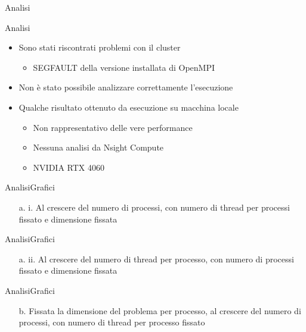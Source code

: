 \begin{frame}
    \centering \Huge
    Analisi
\end{frame}

\begin{frame}{Analisi}
    \begin{itemize}
        \item Sono stati riscontrati problemi con il cluster
              \begin{itemize}
                  \item SEGFAULT della versione installata di OpenMPI
              \end{itemize}
        \item Non è stato possibile analizzare correttamente l'esecuzione
        \item Qualche risultato ottenuto da esecuzione su macchina locale
              \begin{itemize}
                  \item Non rappresentativo delle vere performance
                  \item Nessuna analisi da Nsight Compute
                  \item NVIDIA RTX 4060 %
              \end{itemize}
    \end{itemize}
\end{frame}

\begin{frame}{Analisi}{Grafici}
    \begin{enumerate}
        \item[a. i.] Al crescere del numero di processi, con numero di thread per processi fissato e dimensione fissata
    \end{enumerate}
\end{frame}

\begin{frame}{Analisi}{Grafici}
    \begin{enumerate}
        \item[a. ii.] Al crescere del numero di thread per processo, con numero di processi fissato e dimensione fissata
    \end{enumerate}
\end{frame}

\begin{frame}{Analisi}{Grafici}
    \begin{enumerate}
        \item[b.] Fissata la dimensione del problema per processo, al crescere del numero di processi, con numero di thread per processo fissato
    \end{enumerate}
\end{frame}

